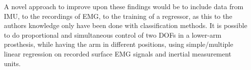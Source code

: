 A novel approach to improve upon these findings would be to include data from IMU, to the recordings of EMG, to the training of a regressor, as this to the authors knowledge only have been done with classification methods. 
It is possible to do proportional and simultaneous control of two DOFs in a lower-arm prosthesis, while having the arm in different positions, using simple/multiple linear regression on recorded surface EMG signals and inertial measurement units. %


